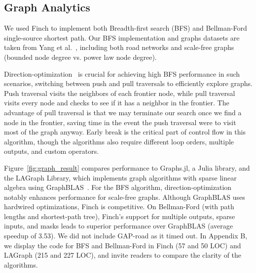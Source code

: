 \subsection{Graph Analytics}

We used Finch to implement both Breadth-first search (BFS) and Bellman-Ford single-source shortest path.
%
Our BFS implementation and graphs datasets are taken from Yang et al.~\cite{yang_implementing_2018}, including both road networks and scale-free graphs (bounded node degree vs. power law node degree).


Direction-optimization~\cite{beamer_direction-optimizing_2012} is crucial for achieving high BFS performance in such scenarios, switching between push and pull traversals to efficiently explore graphs.
%
Push traversal visits the neighbors of each frontier node, while pull traversal visits every node and checks to see if it has a neighbor in the frontier. 
%
The advantage of pull traversal is that we may terminate our search once we find a node in the frontier, saving time in the event the push traversal were to visit most of the graph anyway. 
%
Early break is the critical part of control flow in this algorithm, though the algorithms also require different loop orders, multiple outputs, and custom operators.

Figure~\ref{fig:graph_result} compares performance to Graphs.jl, a Julia library, and the LAGraph Library, which implements graph algorithms with sparse linear algebra using GraphBLAS~\cite{mattson_lagraph_2019}.
%
For the BFS algorithm, direction-optimization notably enhances performance for scale-free graphs. 
%
Although GraphBLAS uses hardwired optimizations, Finch is competitive. 
%
On Bellman-Ford (with path lengths and shortest-path tree), Finch's support for multiple outputs, sparse inputs, and masks leads to superior performance over GraphBLAS (average speedup of 3.53). 
%
We did not include GAP-road as it timed out. %
%
In Appendix B, we display the code for BFS and Bellman-Ford in Finch (57 and 50 LOC) and LAGraph (215 and 227 LOC), and invite readers to compare the clarity of the algorithms.
 
